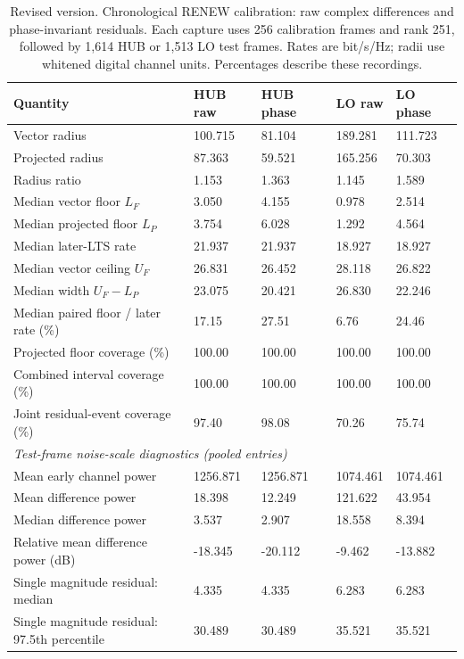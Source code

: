 \documentclass[10pt,letterpaper]{article}
\begin{document}
\begin{table}[p]\color{blue}\centering\small
\setlength{\tabcolsep}{4pt}
\caption{Revised version. Chronological RENEW calibration: raw complex differences and phase-invariant residuals. Each capture uses 256 calibration frames and rank 251, followed by 1,614 HUB or 1,513 LO test frames. Rates are bit/s/Hz; radii use whitened digital channel units. Percentages describe these recordings.}\label{supp:hardware_calibration}
\begin{tabular}{lllll}\toprule
Quantity & HUB raw & HUB phase & LO raw & LO phase\\
\midrule
Vector radius & 100.715 & 81.104 & 189.281 & 111.723\\
Projected radius & 87.363 & 59.521 & 165.256 & 70.303\\
Radius ratio & 1.153 & 1.363 & 1.145 & 1.589\\
Median vector floor $L_F$ & 3.050 & 4.155 & 0.978 & 2.514\\
Median projected floor $L_P$ & 3.754 & 6.028 & 1.292 & 4.564\\
Median later-LTS rate & 21.937 & 21.937 & 18.927 & 18.927\\
Median vector ceiling $U_F$ & 26.831 & 26.452 & 28.118 & 26.822\\
Median width $U_F-L_P$ & 23.075 & 20.421 & 26.830 & 22.246\\
Median paired floor / later rate (\%) & 17.15 & 27.51 & 6.76 & 24.46\\
Projected floor coverage (\%) & 100.00 & 100.00 & 100.00 & 100.00\\
Combined interval coverage (\%) & 100.00 & 100.00 & 100.00 & 100.00\\
Joint residual-event coverage (\%) & 97.40 & 98.08 & 70.26 & 75.74\\
\multicolumn{5}{l}{\textit{Test-frame noise-scale diagnostics (pooled entries)}}\\
Mean early channel power & 1256.871 & 1256.871 & 1074.461 & 1074.461\\
Mean difference power & 18.398 & 12.249 & 121.622 & 43.954\\
Median difference power & 3.537 & 2.907 & 18.558 & 8.394\\
Relative mean difference power (dB) & -18.345 & -20.112 & -9.462 & -13.882\\
Single magnitude residual: median & 4.335 & 4.335 & 6.283 & 6.283\\
Single magnitude residual: 97.5th percentile & 30.489 & 30.489 & 35.521 & 35.521\\

\end{tabular}
\end{table}
\end{document}
